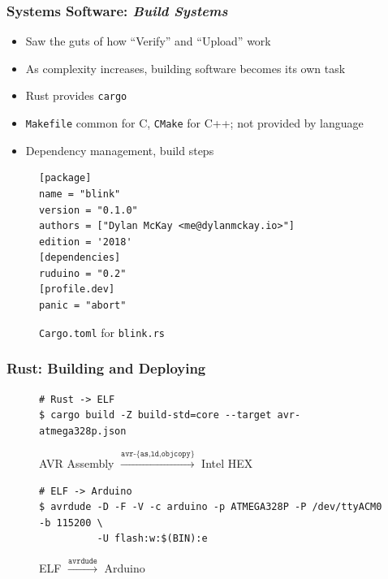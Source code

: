 \documentclass{beamer} \usetheme{Madrid}
\begin{document}
\begin{frame}[fragile]
    \frametitle{Systems Software: \emph{Build Systems}}
    \begin{itemize}
        \item Saw the guts of how ``Verify'' and ``Upload'' work
        \item As complexity increases, building software becomes its own task
        \item Rust provides \texttt{cargo}
        \item \texttt{Makefile} common for C, \texttt{CMake} for C++; not provided by language
        \item Dependency management, build steps
    \end{itemize}
    \begin{figure}
    \begin{verbatim}
[package]
name = "blink"
version = "0.1.0"
authors = ["Dylan McKay <me@dylanmckay.io>"]
edition = '2018'
[dependencies]
ruduino = "0.2"
[profile.dev]
panic = "abort"
    \end{verbatim}
    \caption{\texttt{Cargo.toml} for \texttt{blink.rs}}
    \end{figure}
\end{frame}

\begin{frame}[fragile]
    \frametitle{Rust: Building and Deploying}
    \begin{figure}
        \begin{verbatim}
# Rust -> ELF
$ cargo build -Z build-std=core --target avr-atmega328p.json
        \end{verbatim}
        \caption{AVR Assembly $\xrightarrow{\texttt{avr-\{as,ld,objcopy\}}}$ Intel HEX}
    \end{figure}
    \begin{figure}
        \begin{verbatim}
# ELF -> Arduino
$ avrdude -D -F -V -c arduino -p ATMEGA328P -P /dev/ttyACM0 -b 115200 \
          -U flash:w:$(BIN):e
        \end{verbatim}
        \caption{ELF $\xrightarrow{\texttt{avrdude}}$ Arduino}
    \end{figure}
\end{frame}
\end{document}
